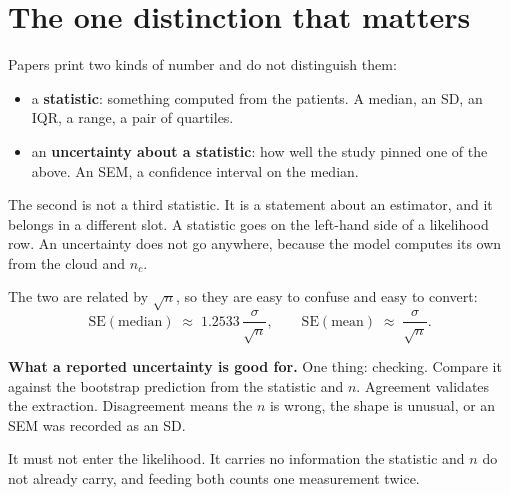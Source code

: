 \documentclass[11pt]{article}
\begin{document}
\section{The one distinction that matters}
\label{sec:distinction}

Papers print two kinds of number and do not distinguish them:

\begin{itemize}
\item a \textbf{statistic}: something computed from the patients. A median, an
      SD, an IQR, a range, a pair of quartiles.
\item an \textbf{uncertainty about a statistic}: how well the study pinned one of
      the above. An SEM, a confidence interval on the median.
\end{itemize}

The second is not a third statistic. It is a statement about an estimator, and it
belongs in a different slot. A statistic goes on the left-hand side of a
likelihood row. An uncertainty does not go anywhere, because the model computes
its own from the cloud and $n_c$.

The two are related by $\sqrt n$, so they are easy to confuse and easy to
convert:
\begin{equation}
\mathrm{SE}(\text{median}) \;\approx\; 1.2533\,\frac{\sigma}{\sqrt n},
\qquad
\mathrm{SE}(\text{mean}) \;\approx\; \frac{\sigma}{\sqrt n}.
\label{eq:convert}
\end{equation}

\begin{notebox}
\textbf{What a reported uncertainty is good for.} One thing: checking. Compare it
against the bootstrap prediction from the statistic and $n$. Agreement validates
the extraction. Disagreement means the $n$ is wrong, the shape is unusual, or an
SEM was recorded as an SD.

It must not enter the likelihood. It carries no information the statistic and $n$
do not already carry, and feeding both counts one measurement twice.
\end{notebox}
\end{document}
